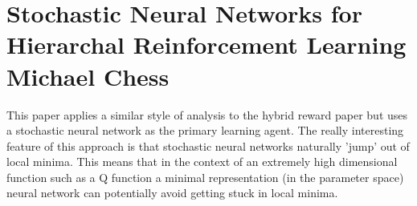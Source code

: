 \section{Stochastic Neural Networks for Hierarchal Reinforcement Learning Michael Chess}

This paper applies a similar style of analysis to the hybrid reward paper but uses a stochastic neural network as the primary learning agent.
The really interesting feature of this approach is that stochastic neural networks naturally 'jump' out of local minima.
This means that in the context of an extremely high dimensional function such as a Q function a minimal representation (in the parameter space) neural network can potentially avoid getting stuck in local minima. 
